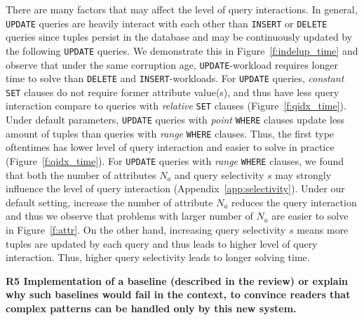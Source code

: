 There are many factors that may affect the level of query interactions. In general, \texttt{UPDATE} queries are heavily interact with each other than \texttt{INSERT} or \texttt{DELETE} queries since tuples persist in the database and may be continuously updated by the following \texttt{UPDATE} queries. We demonstrate this in Figure~\ref{f:indelup_time} and observe that under the same corruption age, \texttt{UPDATE}-workload requires longer time to solve than \texttt{DELETE} and \texttt{INSERT}-workloads. For \texttt{UPDATE} queries, \textit{constant} \texttt{SET} clauses do not require former attribute value(s), and thus have less query interaction compare to queries with \textit{relative} \texttt{SET} clauses (Figure~\ref{f:qidx_time}). Under default parameters, \texttt{UPDATE} queries with \textit{point} \texttt{WHERE} clauses update less amount of tuples than queries with \textit{range} \texttt{WHERE} clauses. Thus, the first type oftentimes has lower level of query interaction and easier to solve in practice (Figure~\ref{f:qidx_time}). For \texttt{UPDATE} queries with \textit{range} \texttt{WHERE} clauses, we found that both the number of attributes $N_a$ and query selectivity $s$ may strongly influence the level of query interaction (Appendix~\ref{app:selectivity}). Under our default setting, increase the number of attribute $N_a$ reduces the query interaction and thus we observe that problems with larger number of $N_a$ are easier to solve in Figure~\ref{f:attr}. On the other hand, increasing query selectivity $s$ means more tuples are updated by each query and thus leads to higher level of query interaction. Thus, higher query selectivity leads to longer solving time.


\noindent \textbf{R5 Implementation of a baseline (described in the review) or explain why such baselines would fail in the context, to convince readers that complex patterns can be handled only by this new system.}

